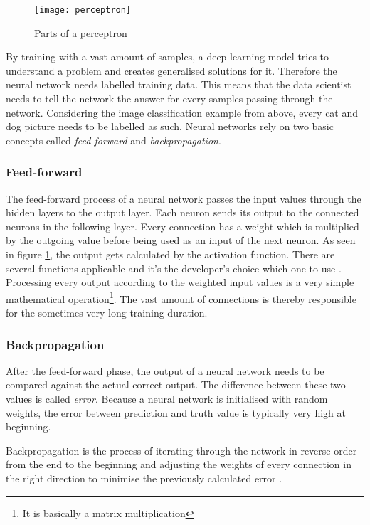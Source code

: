 \begin{figure}[!ht]
    \centering
    \texttt{[image: perceptron]}
    \caption{Parts of a perceptron}
    \label{fig:perceptron}
\end{figure}

By training with a vast amount of samples, a deep learning model tries to understand a problem and creates generalised solutions for it. Therefore the neural network needs labelled training data. This means that the data scientist needs to tell the network the answer for every samples passing through the network. Considering the image classification example from above, every cat and dog picture needs to be labelled as such. Neural networks rely on two basic concepts called \emph{feed-forward} and \emph{backpropagation}.

\subsubsection{Feed-forward}

The feed-forward process of a neural network passes the input values through the hidden layers to the output layer. Each neuron sends its output to the connected neurons in the following layer. Every connection has a weight which is multiplied by the outgoing value before being used as an input of the next neuron. As seen in figure \ref{fig:perceptron}, the output gets calculated by the activation function. There are several functions applicable and it's the developer's choice which one to use \cite{nn}. Processing every output according to the weighted input values is a very simple mathematical operation\footnote{It is basically a matrix multiplication}. The vast amount of connections is thereby responsible for the sometimes very long training duration.

\subsubsection{Backpropagation}

After the feed-forward phase, the output of a neural network needs to be compared against the actual correct output. The difference between these two values is called \emph{error}. Because a neural network is initialised with random weights, the error between prediction and truth value is typically very high at beginning.

Backpropagation is the process of iterating through the network in reverse order from the end to the beginning and adjusting the weights of every connection in the right direction to minimise the previously calculated error \cite{nn}.

